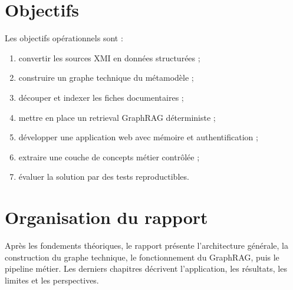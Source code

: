 \section{Objectifs}

Les objectifs opérationnels sont :

\begin{enumerate}
  \item convertir les sources XMI en données structurées ;
  \item construire un graphe technique du métamodèle ;
  \item découper et indexer les fiches documentaires ;
  \item mettre en place un retrieval GraphRAG déterministe ;
  \item développer une application web avec mémoire et authentification ;
  \item extraire une couche de concepts métier contrôlée ;
  \item évaluer la solution par des tests reproductibles.
\end{enumerate}

\section{Organisation du rapport}

Après les fondements théoriques, le rapport présente l'architecture générale, la construction du graphe technique, le fonctionnement du GraphRAG, puis le pipeline métier. Les derniers chapitres décrivent l'application, les résultats, les limites et les perspectives.


